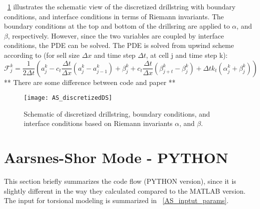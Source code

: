 \figurename~\ref{AS_discretizeDS} illustrates the schematic view of the discretized drillstring with boundary conditions, and interface conditions in terms of Riemann invariants. The boundary conditions at the top and bottom of the drillsring are applied to $\alpha$, and $\beta$, respectively. However, since the two variables are coupled by interface conditions, the PDE can be solved. 
The PDE is solved from upwind scheme according to (for sell size $\Delta x$ and time step $\Delta t$, at cell j and time step k):
\begin{equation}\label{AS-upwind}
  \mathcal{F}_{j}^k = \frac{1}{2 \Delta t}\left(a_j^k - c_t \frac{\Delta t}{\Delta x}(a_j^k - a_{j-1}^k) + \beta_j^k + c_t \frac{\Delta t}{\Delta x}(\beta_{j+t}^k-\beta_j^k) + \Delta t k_t (\alpha_j^k + \beta_j^k)\right)
\end{equation}
** There are some difference between code and paper **
\newpage
\begin{figure}[ht]
  \centering
  \texttt{[image: AS\_discretizedDS]}
  \caption[Schematic of discretized drillstring and boundary conditions]{Schematic of discretized drillstring, boundary conditions, and interface conditions based on Riemann invariants $\alpha$, and $\beta$.}\label{AS_discretizeDS}
\end{figure}
\section{Aarsnes-Shor Mode - PYTHON}
This section briefly summarizes the code flow (PYTHON version), since it is slightly different in the way they calculated compared to the MATLAB version. The input for torsional modeling is summarized in \tablename~\ref{AS_inptut_params}.

